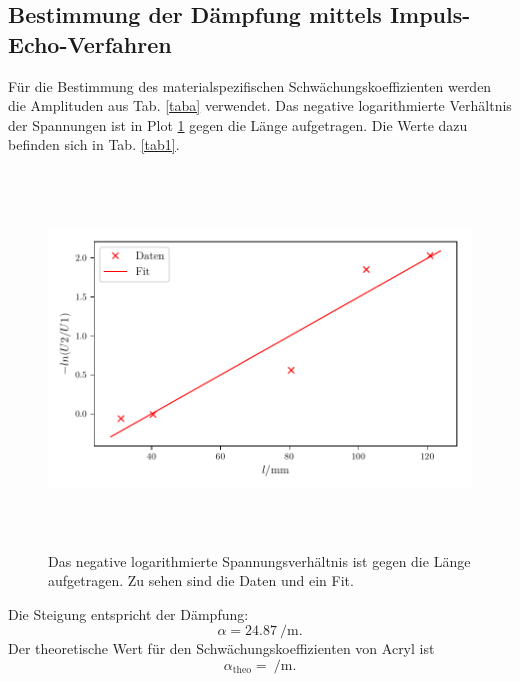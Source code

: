 \subsection{Bestimmung der Dämpfung mittels Impuls-Echo-Verfahren}
Für die Bestimmung des materialspezifischen Schwächungskoeffizienten werden
die Amplituden aus Tab. \ref{taba} verwendet.
Das negative logarithmierte Verhältnis der Spannungen ist in Plot \ref{fig:plot1}
gegen die Länge aufgetragen. Die Werte dazu befinden sich in Tab. \ref{tab1}.

\begin{figure}
 \centering
 \includegraphics[width=15cm, height=10cm]{build/plot1.pdf}
 \caption{Das negative logarithmierte Spannungsverhältnis ist gegen die Länge aufgetragen.
 Zu sehen sind die Daten und ein Fit.}
 \label{fig:plot1}
\end{figure}
\noindent Die Steigung entspricht der Dämpfung:
\begin{equation*}
    \alpha = \SI{24.87}{\per\meter}.
\end{equation*}
Der theoretische Wert für den Schwächungskoeffizienten von Acryl ist %
\begin{equation*}
    \alpha_{\text{theo}} = \SI{}{\per\meter}. 
\end{equation*}

